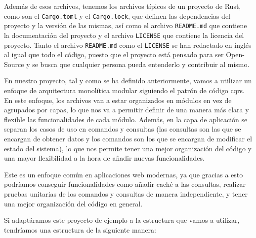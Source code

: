 Además de esos archivos, tenemos los archivos típicos de un proyecto de Rust, como son el \texttt{Cargo.toml} y el \texttt{Cargo.lock}, que definen las dependencias del proyecto y la versión de las mismas, así como el archivo \texttt{README.md} que contiene la documentación del proyecto y el archivo \texttt{LICENSE} que contiene la licencia del proyecto. Tanto el archivo \texttt{README.md} como el \texttt{LICENSE} se han redactado en inglés al igual que todo el código, puesto que el proyecto está pensado para ser Open-Source y se busca que cualquier persona pueda entenderlo y contribuir al mismo.

En nuestro proyecto, tal y como se ha definido anteriormente, vamos a utilizar un enfoque de arquitectura monolítica modular siguiendo el patrón de código \acrshort{cqrs}.
En este enfoque, los archivos van a estar organizados en módulos en vez de agrupados por capas, lo que nos va a permitir definir de una manera más clara y flexible las funcionalidades de cada módulo.
Además, en la capa de aplicación se separan los casos de uso en comandos y consultas (las consultas son las que se encargan de obtener datos y los comandos son los que se encargan de modificar el estado del sistema), lo que nos permite tener una mejor organización del código y una mayor flexibilidad a la hora de añadir nuevas funcionalidades.

Este es un enfoque común en aplicaciones web modernas, ya que gracias a esto podríamos conseguir funcionalidades como añadir caché a las consultas, realizar pruebas unitarias de los comandos y consultas de manera independiente, y tener una mejor organización del código en general.

Si adaptáramos este proyecto de ejemplo a la estructura que vamos a utilizar, tendríamos una estructura de la siguiente manera:

\newpage
{}

